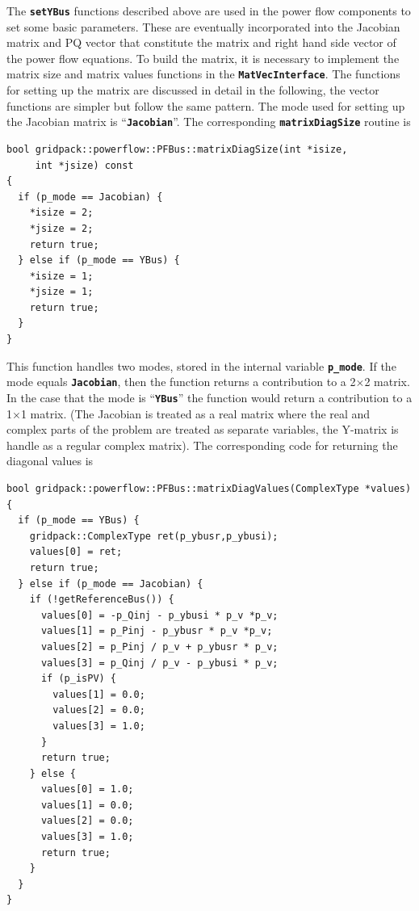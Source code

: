 The \texttt{\textbf{setYBus}} functions described above are used in the power flow components to set some basic parameters. These are eventually incorporated into the Jacobian matrix and PQ vector that constitute the matrix and right hand side vector of the power flow equations. To build the matrix, it is necessary to implement the matrix size and matrix values functions in the \texttt{\textbf{MatVecInterface}}. The functions for setting up the matrix are discussed in detail in the following, the vector functions are simpler but follow the same pattern. The mode used for setting up the Jacobian matrix is ``\texttt{\textbf{Jacobian}}''. The corresponding \texttt{\textbf{matrixDiagSize}} routine is

{
\color{red}
\begin{Verbatim}[fontseries=b]
bool gridpack::powerflow::PFBus::matrixDiagSize(int *isize,
     int *jsize) const
{
  if (p_mode == Jacobian) {
    *isize = 2;
    *jsize = 2;
    return true;
  } else if (p_mode == YBus) {
    *isize = 1;
    *jsize = 1;
    return true;
  }
}
\end{Verbatim}
}

This function handles two modes, stored in the internal variable \texttt{\textbf{p\_mode}}. If the mode equals \texttt{\textbf{Jacobian}}, then the function returns a contribution to a 2$\mathrm{\times}$2 matrix. In the case that the mode is ``\texttt{\textbf{YBus}}'' the function would return a contribution to a 1$\mathrm{\times}$1 matrix. (The Jacobian is treated as a real matrix where the real and complex parts of the problem are treated as separate variables, the Y-matrix is handle as a regular complex matrix). The corresponding code for returning the diagonal values is

{
\color{red}
\begin{Verbatim}[fontseries=b]
bool gridpack::powerflow::PFBus::matrixDiagValues(ComplexType *values)
{
  if (p_mode == YBus) {
    gridpack::ComplexType ret(p_ybusr,p_ybusi);
    values[0] = ret;
    return true;
  } else if (p_mode == Jacobian) {
    if (!getReferenceBus()) {
      values[0] = -p_Qinj - p_ybusi * p_v *p_v;
      values[1] = p_Pinj - p_ybusr * p_v *p_v;
      values[2] = p_Pinj / p_v + p_ybusr * p_v;
      values[3] = p_Qinj / p_v - p_ybusi * p_v;
      if (p_isPV) {
        values[1] = 0.0;
        values[2] = 0.0;
        values[3] = 1.0;
      }
      return true;
    } else {
      values[0] = 1.0;
      values[1] = 0.0;
      values[2] = 0.0;
      values[3] = 1.0;
      return true;
    }
  }
}
\end{Verbatim}
}

